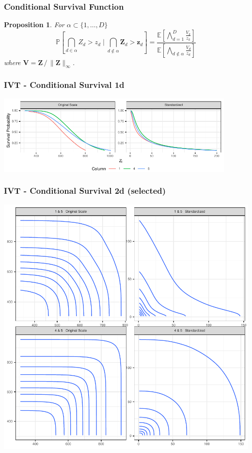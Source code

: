\documentclass[aspectratio=169,10pt]{beamer}
\newtheorem{prop}{Proposition}
\newlength{\frametextheight}
\begin{document}
\begin{frame}
  \frametitle{Conditional Survival Function}
  \begin{prop}
      For $\alpha \subset \lbrace 1, \ldots, D\rbrace$
    \[
        \mathbb{P}\left[\bigcap_{d\in\alpha}Z_{d} > z_d\mid \bigcap_{d\not\in\alpha}\bm{Z}_{d} > \bm{z}_{d}\right] =
        \frac{\mathbb{E}\left[\bigwedge_{d = 1}^D \frac{V_k}{z_k}\right]}{
                      \mathbb{E}\left[\bigwedge_{d\not\in\alpha}\frac{V_d}{z_d}\right]}
    \]
      where $\bm{V} = \bm{Z}\,/\,\lVert\bm{Z}\rVert_{\infty}$.
  \end{prop}
\end{frame} %


\begin{frame}
  \frametitle{IVT - Conditional Survival 1d}
  \begin{center}
    \includegraphics[height=0.8\frametextheight,width=0.9\textwidth]{./ch1/images/condsurv_1d}
  \end{center}
\end{frame} %

\begin{frame}
  \frametitle{IVT - Conditional Survival 2d (selected)}
  \begin{center}
    \includegraphics[height=\frametextheight,width=\frametextheight]{./ch1/images/condsurv_2d}
  \end{center}
\end{frame} %
\end{document}
